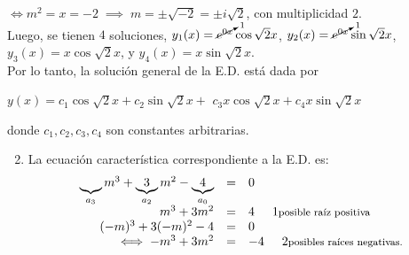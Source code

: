 \documentclass{beamer}
\begin{document}
\begin{frame}[t]
	\begin{exampleblock}{}
		\(\iff m^2 = x = -2 \;\implies\; m = \pm \sqrt{-2} = \pm i \sqrt{2}\), con multiplicidad \(2\). \\
		Luego, se tienen \(4\) soluciones, \(y_1(x) = \cancelto{1}{e^{0x}} \cos \sqrt{2} x \), \(y_2(x) = \cancelto{1}{e^{0x} }\sin \sqrt{2} x\), \(y_3(x) = x \cos \sqrt{2} x\), y \(y_4(x) = x \sin \sqrt{2} x\). \\[2mm]
		Por lo tanto, la solución general de la E.D. está dada por
		\begin{center}
			\(y(x) = c_1 \cos \sqrt{2} x + c_2 \sin \sqrt{2} x +\) \color{red} \underline{\color{black} \(c_3x \cos \sqrt{2} x + c_4 x \sin \sqrt{2} x\)}
		\end{center}
		donde \(c_1,c_2,c_3,c_4\) son constantes arbitrarias.
		\begin{enumerate}
			\setcounter{enumi}{1}
		\item La ecuación característica correspondiente a la E.D. es: \vspace{-3mm}
				\[
					\begin{array}{rcl}
						\underbrace{}_{a_3} m^3+ \underbrace{3} _{a_2} m^2- \underbrace{4} _{a_0} & = & 0 \\
						m^3+3m^2 & = & 4 \hspace{5mm} 1\mbox{\footnotesize posible raíz positiva} \\
						(-m) ^3+3(-m) ^2-4 & = & 0 \\
						\iff -m^3+3m^2 & = & -4 \hspace{5mm} 2 \mbox{\footnotesize posibles raíces negativas.}
					\end{array}
				\]
		\end{enumerate}
	\end{exampleblock}
\end{frame}
\end{document}
